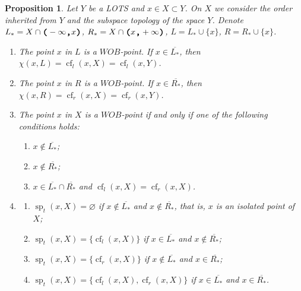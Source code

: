 \documentclass[preprint]{elsarticle}
\def\cl#1{\overline{#1}}
\def\sp{\operatorname{sp}}
\def\es{\varnothing}
\def\sset#1{\{#1\}}
\newtheorem{proposition}{Proposition}[section]
\theoremstyle{definition}
\theoremstyle{remark}
\def\cf{\operatorname{cf}}
\def\wob/{$WOB$}
\def\lL(#1,#2){(-\infty,#1)}
\def\lR(#1,#2){(#1,+\infty)}
\def\ilcomma/{\boldsymbol{,}}
\def\ilsymlp{\boldsymbol{(}}
\def\ilsymrp{\boldsymbol{)}}
\def\ilfont#1{\boldsymbol{#1}}
\def\ilfontX#1{\mathrm{\text{\texttt{\textbf{\large #1}}}}}
\def\ilfontX#1{{\text{\texttt{\textbf{\large \upshape #1}}}}}
\def\ilfont#1{\raisebox{-1.2pt}{\ilfontX{#1}}}
\def\ilfontC#1{\raisebox{-0.7pt}{\ilfontX{#1}}}
\def\ilcomma/{\ilfontC{,}}
\def\ilsymlp{\ilfont{(}}
\def\ilsymrp{\ilfont{)}}
\def\ilpp(#1,#2){\ilsymlp#1\ilcomma/ #2\ilsymrp}
\def\lL(#1,#2){\ilpp(-\infty, #1)}
\def\lR(#1,#2){\ilpp(#1, +\infty)}
\begin{document}
\begin{proposition}\label{p:1+0}
Let $Y$ be a LOTS and $x\in X\subset Y$.
On $X$ we consider the order inherited from $Y$ and the subspace topology of the space $Y$.
Denote $L_*=X\cap \lL(x,Y)$, $R_*=X\cap \lR(x,Y)$, $L=L_*\cup \sset x$, $R=R_*\cup \sset x$.
\begin{enumerate}
\item
The point $x$ in $L$ is a \wob/-point. If $x\in \cl{L_*}$, then $\chi(x,L)=\cf_l(x,X)=\cf_l(x,Y)$.
\item
The point $x$ in $R$ is a \wob/-point. If $x\in \cl{R_*}$, then $\chi(x,R)=\cf_r(x,X)=\cf_r(x,Y)$.
\item
The point $x$ in $X$ is a \wob/-point if and only if one of the following conditions holds:
\begin{enumerate}
\item
$x\notin \cl{L_*}$;
\item
$x\notin \cl{R_*}$;
\item
$x\in \cl{L_*}\cap \cl{R_*}$ and $\cf_l(x,X)=\cf_r(x,X)$.
\end{enumerate}
\item
\begin{enumerate}
\item
$\sp_t(x,X)=\es$ if 
$x\notin \cl{L_*}$ and $x\notin \cl{R_*}$, that is, $x$ is an isolated point of $X$;
\item
$\sp_t(x,X)=\sset{\cf_l(x,X)}$ 
if $x\in \cl{L_*}$ and $x\notin \cl{R_*}$;
\item
$\sp_t(x,X)=\sset{\cf_r(x,X)}$ 
if $x\notin \cl{L_*}$ and $x\in \cl{R_*}$;
\item
$\sp_t(x,X)=\sset{\cf_l(x,X),\cf_r(x,X)}$ 
if $x\in \cl{L_*}$ and $x\in \cl{R_*}$.
\end{enumerate}
\end{enumerate}
\end{proposition}
\end{document}
